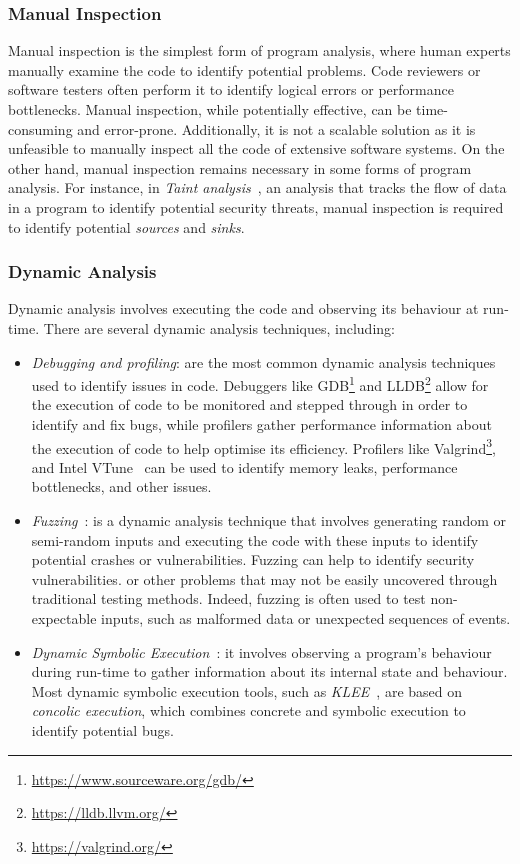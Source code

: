 \subsubsection{Manual Inspection}
Manual inspection is the simplest form of program analysis, where human experts
manually examine the code to identify potential problems. Code reviewers or software 
testers often perform it to identify logical errors or performance bottlenecks. 
Manual inspection, while potentially effective, can
be time-consuming and error-prone. Additionally, it is not a scalable solution as 
it is unfeasible to manually inspect all the code of extensive software systems. 
On the other hand, manual inspection remains necessary in some forms of program analysis. For instance,
in \emph{Taint analysis}~\cite{flowDroid}, an analysis that tracks the flow of data in a program
to identify potential security threats, manual inspection is required to identify
potential \emph{sources} and \emph{sinks}.

\subsubsection{Dynamic Analysis}
Dynamic analysis involves executing the code and observing its behaviour at run-time.
There are several dynamic analysis techniques, including:
\begin{itemize}
  \item \emph{Debugging and profiling}: are the most common dynamic analysis techniques used to identify issues in code.
  Debuggers like GDB\footnote{\url{https://www.sourceware.org/gdb/}} and LLDB\footnote{\url{https://lldb.llvm.org/}} allow for the execution of code to be
  monitored and stepped through in order to identify and fix bugs,
  while profilers gather performance information about the execution of code to help optimise its efficiency.
  Profilers like Valgrind\footnote{\url{https://valgrind.org/}}, and Intel VTune~\cite{reinders2005vtune} can be used to identify memory leaks,
  performance bottlenecks, and other issues.
  \item \emph{Fuzzing}~\cite{li2018fuzzing}: is a dynamic analysis technique that 
  involves generating random or semi-random inputs and executing the code with these 
  inputs to identify potential crashes or vulnerabilities. Fuzzing can help to 
  identify security vulnerabilities.
  or other problems that may not be easily uncovered through traditional testing methods.
  Indeed, fuzzing is often used to test non-expectable inputs, such as malformed data
  or unexpected sequences of events.
  \item \emph{Dynamic Symbolic Execution}~\cite{Baldoni2018Survey}: it involves 
  observing a program's behaviour during run-time to gather information about its 
  internal state and behaviour.
  Most dynamic symbolic execution tools,
  such as \emph{KLEE}~\cite{cadar2008klee}, are based on \emph{concolic execution},
  which combines concrete and symbolic execution to identify potential bugs.
\end{itemize}

